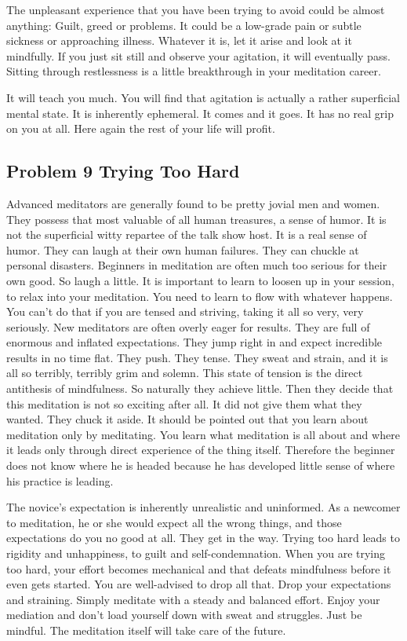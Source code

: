 The unpleasant experience that you have been trying to avoid could be almost
anything: Guilt, greed or problems. It could be a low-grade pain or subtle
sickness or approaching illness. Whatever it is, let it arise and look at it
mindfully. If you just sit still and observe your agitation, it will eventually
pass. Sitting through restlessness is a little breakthrough in your meditation
career.

It will teach you much. You will find that agitation is actually a rather
superficial mental state. It is inherently ephemeral. It comes and it goes. It
has no real grip on you at all. Here again the rest of your life will profit.

\subsection*{Problem 9 Trying Too Hard} 
Advanced meditators are generally found to be pretty
jovial men and women. They possess that most valuable of all human treasures, a
sense of humor. It is not the superficial witty repartee of the talk show host.
It is a real sense of humor. They can laugh at their own human failures. They
can chuckle at personal disasters. Beginners in meditation are often much too
serious for their own good. So laugh a little. It is important to learn to
loosen up in your session, to relax into your meditation. You need to learn to
flow with whatever happens. You can't do that if you are tensed and striving,
taking it all so very, very seriously. New meditators are often overly eager for
results. They are full of enormous and inflated expectations. They jump right in
and expect incredible results in no time flat. They push. They tense. They sweat and
strain, and it is all so terribly, terribly grim and solemn. This state of
tension is the direct antithesis of mindfulness. So naturally they achieve
little. Then they decide that this meditation is not so exciting after all. It
did not give them what they wanted. They chuck it aside. It should be pointed
out that you learn about meditation only by meditating. You learn what
meditation is all about and where it leads only through direct experience of the
thing itself. Therefore the beginner does not know where he is headed because he
has developed little sense of where his practice is leading.

The novice's expectation is inherently unrealistic and uninformed. As a newcomer
to meditation, he or she would expect all the wrong things, and those
expectations do you no good at all. They get in the way. Trying too hard leads
to rigidity and unhappiness, to guilt and self-condemnation. When you are trying
too hard, your effort becomes mechanical and that defeats mindfulness before it
even gets started. You are well-advised to drop all that. Drop your expectations
and straining. Simply meditate with a steady and balanced effort. Enjoy your
mediation and don't load yourself down with sweat and struggles. Just be
mindful. The meditation itself will take care of the future.

